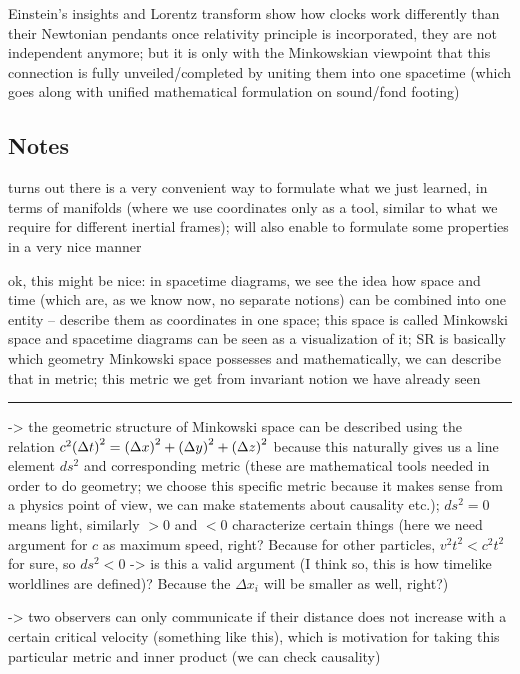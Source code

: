 Einstein's insights and Lorentz transform show how clocks work differently than their Newtonian pendants once relativity principle is incorporated, they are not independent anymore; but it is only with the Minkowskian viewpoint that this connection is fully unveiled/completed by uniting them into one spacetime (which goes along with unified mathematical formulation on sound/fond footing)



		\subsection{Notes}

turns out there is a very convenient way to formulate what we just learned, in terms of manifolds (where we use coordinates only as a tool, similar to what we require for different inertial frames); will also enable to formulate some properties in a very nice manner

ok, this might be nice: in spacetime diagrams, we see the idea how space and time (which are, as we know now, no separate notions) can be combined into one entity -- describe them as coordinates in one space; this space is called Minkowski space and spacetime diagrams can be seen as a visualization of it; SR is basically which geometry Minkowski space possesses and mathematically, we can describe that in metric; this metric we get from invariant notion we have already seen

\hrule

-> the geometric structure of Minkowski space can be described using the relation $c^2 \qty(\Delta t)^2 = \qty(\Delta x)^2 + \qty(\Delta y)^2 + \qty(\Delta z)^2$ because this naturally gives us a line element $ds^2$ and corresponding metric (these are mathematical tools needed in order to do geometry; we choose this specific metric because it makes sense from a physics point of view, we can make statements about causality etc.); $ds^2 = 0$ means light, similarly $> 0$ and $< 0$ characterize certain things (here we need argument for $c$ as maximum speed, right? Because for other particles, $v^2 t^2 < c^2 t^2$ for sure, so $ds^2 < 0$ -> is this a valid argument (I think so, this is how timelike worldlines are defined)? Because the $\Delta x_i$ will be smaller as well, right?)

-> two observers can only communicate if their distance does not increase with a certain critical velocity (something like this), which is motivation for taking this particular metric and inner product (we can check causality)

